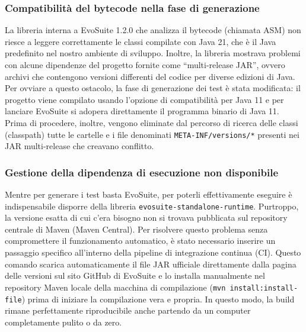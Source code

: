 \subsubsection{Compatibilità del bytecode nella fase di generazione}
La libreria interna a EvoSuite 1.2.0 che analizza il bytecode (chiamata ASM) 
non riesce a leggere correttamente le classi compilate con Java 21, 
che è il Java predefinito nel nostro ambiente di sviluppo. Inoltre, 
la libreria mostrava problemi con alcune dipendenze del progetto 
fornite come ``multi-release JAR'', ovvero archivi che contengono 
versioni differenti del codice per diverse edizioni di Java. 
Per ovviare a questo ostacolo, la fase di generazione dei test è stata modificata: 
il progetto viene compilato usando l'opzione di compatibilità per Java 11 
e per lanciare EvoSuite si adopera direttamente il programma binario di Java 11. 
Prima di procedere, inoltre, vengono eliminate dal percorso di ricerca 
delle classi (classpath) tutte le cartelle e i file denominati 
\texttt{META-INF/versions/*} presenti nei JAR multi-release che creavano conflitto.

\subsubsection{Gestione della dipendenza di esecuzione non disponibile}
Mentre per generare i test basta EvoSuite, per poterli effettivamente eseguire 
è indispensabile disporre della libreria \texttt{evosuite-standalone-runtime}. 
Purtroppo, la versione esatta di cui c'era bisogno non si trovava 
pubblicata sul repository centrale di Maven (Maven Central). 
Per risolvere questo problema senza compromettere il funzionamento automatico, 
è stato necessario inserire un passaggio specifico all'interno della pipeline di integrazione continua (CI). 
Questo comando scarica automaticamente il file JAR ufficiale direttamente 
dalla pagina delle versioni sul sito GitHub di EvoSuite e lo installa manualmente 
nel repository Maven locale della macchina di compilazione (\texttt{mvn install:install-file}) 
prima di iniziare la compilazione vera e propria. In questo modo, la build 
rimane perfettamente riproducibile anche partendo da un computer completamente pulito o da zero.


